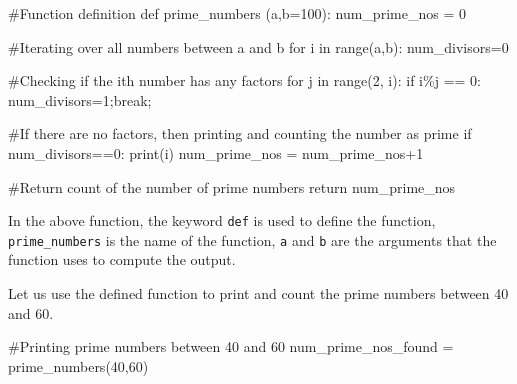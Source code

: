\documentclass[
  letterpaper,
  DIV=11,
  numbers=noendperiod]{scrreprt}
\newenvironment{Shaded}{\begin{snugshade}}{\end{snugshade}}
\newcommand{\BuiltInTok}[1]{\textcolor[rgb]{0.00,0.23,0.31}{#1}}
\newcommand{\CommentTok}[1]{\textcolor[rgb]{0.37,0.37,0.37}{#1}}
\newcommand{\ControlFlowTok}[1]{\textcolor[rgb]{0.00,0.23,0.31}{#1}}
\newcommand{\DecValTok}[1]{\textcolor[rgb]{0.68,0.00,0.00}{#1}}
\newcommand{\KeywordTok}[1]{\textcolor[rgb]{0.00,0.23,0.31}{#1}}
\newcommand{\NormalTok}[1]{\textcolor[rgb]{0.00,0.23,0.31}{#1}}
\newcommand{\OperatorTok}[1]{\textcolor[rgb]{0.37,0.37,0.37}{#1}}
\begin{document}
\begin{Shaded}
\begin{Highlighting}[]
\CommentTok{\#Function definition}
\KeywordTok{def}\NormalTok{ prime\_numbers (a,b}\OperatorTok{=}\DecValTok{100}\NormalTok{):}
\NormalTok{    num\_prime\_nos }\OperatorTok{=} \DecValTok{0}
    
    \CommentTok{\#Iterating over all numbers between a and b}
    \ControlFlowTok{for}\NormalTok{ i }\KeywordTok{in} \BuiltInTok{range}\NormalTok{(a,b):}
\NormalTok{        num\_divisors}\OperatorTok{=}\DecValTok{0}
        
        \CommentTok{\#Checking if the ith number has any factors}
        \ControlFlowTok{for}\NormalTok{ j }\KeywordTok{in} \BuiltInTok{range}\NormalTok{(}\DecValTok{2}\NormalTok{, i):}
            \ControlFlowTok{if}\NormalTok{ i}\OperatorTok{\%}\NormalTok{j }\OperatorTok{==} \DecValTok{0}\NormalTok{:}
\NormalTok{                num\_divisors}\OperatorTok{=}\DecValTok{1}\OperatorTok{;}\ControlFlowTok{break}\OperatorTok{;}
                
        \CommentTok{\#If there are no factors, then printing and counting the number as prime        }
        \ControlFlowTok{if}\NormalTok{ num\_divisors}\OperatorTok{==}\DecValTok{0}\NormalTok{:}
            \BuiltInTok{print}\NormalTok{(i)}
\NormalTok{            num\_prime\_nos }\OperatorTok{=}\NormalTok{ num\_prime\_nos}\OperatorTok{+}\DecValTok{1}
            
    \CommentTok{\#Return count of the number of prime numbers}
    \ControlFlowTok{return}\NormalTok{ num\_prime\_nos}
\end{Highlighting}
\end{Shaded}

In the above function, the keyword \texttt{def} is used to define the
function, \texttt{prime\_numbers} is the name of the function,
\texttt{a} and \texttt{b} are the arguments that the function uses to
compute the output.

Let us use the defined function to print and count the prime numbers
between 40 and 60.

\begin{Shaded}
\begin{Highlighting}[]
\CommentTok{\#Printing prime numbers between 40 and 60}
\NormalTok{num\_prime\_nos\_found }\OperatorTok{=}\NormalTok{ prime\_numbers(}\DecValTok{40}\NormalTok{,}\DecValTok{60}\NormalTok{)}
\end{Highlighting}
\end{Shaded}
\end{document}
